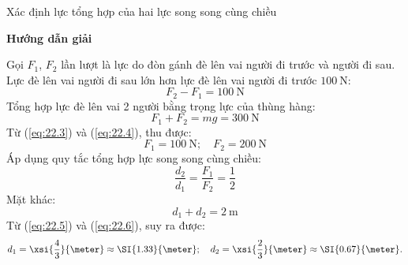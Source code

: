 \begin{dang}{Xác định lực tổng hợp của hai lực song song cùng chiều}
{\begin{center}
			\label{fig:22.3}
		\end{center}
	}
	{\begin{center}
			\textbf{Hướng dẫn giải}
		\end{center}
		Gọi $F_1$, $F_2$ lần lượt là lực do đòn gánh đè lên vai người đi trước và người đi sau.\\
		Lực đè lên vai người đi sau lớn hơn lực đè lên vai người đi trước $\SI{100}{\newton}$:
		\begin{equation}
			\label{eq:22.3}
			F_2-F_1=\SI{100}{\newton}
		\end{equation}
		Tổng hợp lực đè lên vai 2 người bằng trọng lực của thùng hàng:
		\begin{equation}
			\label{eq:22.4}
			F_1+F_2=mg=\SI{300}{\newton}
		\end{equation}
		Từ (\ref{eq:22.3}) và (\ref{eq:22.4}), thu được:
		$$F_1=\SI{100}{\newton}; \quad F_2=\SI{200}{\newton}$$
		Áp dụng quy tắc tổng hợp lực song song cùng chiều:
		\begin{equation}
			\label{eq:22.5}
			\dfrac{d_2}{d_1}=\dfrac{F_1}{F_2}=\dfrac{1}{2}
		\end{equation}
		Mặt khác:
		\begin{equation}
			\label{eq:22.6}
			d_1+d_2=\SI{2}{\meter}
		\end{equation}
		Từ (\ref{eq:22.5}) và (\ref{eq:22.6}), suy ra được:
		$$d_1=\xsi{\dfrac{4}{3}}{\meter}\approx\SI{1.33}{\meter}; \quad d_2=\xsi{\dfrac{2}{3}}{\meter}\approx\SI{0.67}{\meter}.$$
	}
\end{dang}